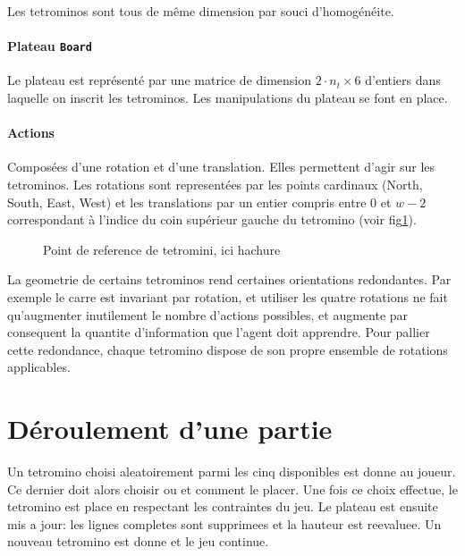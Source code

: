 \documentclass{report}
\begin{document}
Les tetrominos sont tous de même dimension par souci d'homogénéite.

\paragraph{Plateau \texttt{Board}}
Le plateau est représenté par une matrice de dimension
\(2\cdot n_t \times 6\) d'entiers dans laquelle on inscrit les tetrominos. Les
manipulations du plateau se font en place.


\paragraph{Actions}
Composées d'une rotation et d'une translation. Elles permettent d'agir sur les
tetrominos. Les rotations sont representées par les points cardinaux
(North, South, East, West) et les translations par un entier compris entre 0 et
\(w - 2\) correspondant à l'indice du coin supérieur gauche du tetromino
(voir fig\ref{fig:tetref}).

\begin{figure}[h]
  \centering
  \qquad
  \caption{Point de reference de tetromini, ici hachure}\label{fig:tetref}
\end{figure}

La geometrie de certains tetrominos rend certaines orientations redondantes. Par
exemple le carre est invariant par rotation, et utiliser les quatre rotations
ne fait qu'augmenter inutilement le nombre d'actions possibles, et augmente par
consequent la quantite d'information que l'agent doit apprendre. Pour pallier
cette redondance, chaque tetromino dispose de son propre ensemble de rotations
applicables.

\section{Déroulement d'une partie}
Un tetromino choisi aleatoirement parmi les cinq disponibles est donne au
joueur. Ce dernier doit alors choisir ou et comment le placer. Une fois ce
choix effectue, le tetromino est place en respectant les contraintes du jeu. Le
plateau est ensuite mis a jour: les lignes completes sont supprimees et la
hauteur est reevaluee. Un nouveau tetromino est donne et le jeu continue.
\end{document}

